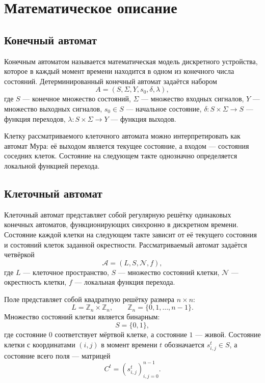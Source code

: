 \section{Математическое описание}

\subsection{Конечный автомат}

Конечным автоматом называется математическая модель дискретного устройства,
которое в каждый момент времени находится в одном из конечного числа состояний.
Детерминированный конечный автомат задаётся набором
\begin{equation}
    A = (S, \Sigma, Y, s_0, \delta, \lambda),
\end{equation}
где $S$ --- конечное множество состояний, $\Sigma$ --- множество входных
сигналов, $Y$ --- множество выходных сигналов, $s_0 \in S$ --- начальное
состояние, $\delta \colon S \times \Sigma \to S$ --- функция переходов,
$\lambda \colon S \times \Sigma \to Y$ --- функция выходов.

Клетку рассматриваемого клеточного автомата можно интерпретировать как автомат
Мура: её выходом является текущее состояние, а входом --- состояния соседних
клеток. Состояние на следующем такте однозначно определяется локальной функцией
перехода.

\subsection{Клеточный автомат}

Клеточный автомат представляет собой регулярную решётку одинаковых конечных
автоматов, функционирующих синхронно в дискретном времени. Состояние каждой
клетки на следующем такте зависит от её текущего состояния и состояний клеток
заданной окрестности. Рассматриваемый автомат задаётся четвёркой
\begin{equation}
    \mathcal{A} = (L, S, \mathcal{N}, f),
\end{equation}
где $L$ --- клеточное пространство, $S$ --- множество состояний клетки,
$\mathcal{N}$ --- окрестность клетки, $f$ --- локальная функция перехода.

Поле представляет собой квадратную решётку размера $n \times n$:
\begin{equation}
    L = \mathbb{Z}_n \times \mathbb{Z}_n,
    \qquad
    \mathbb{Z}_n = \{0, 1, \ldots, n-1\}.
\end{equation}
Множество состояний клетки является бинарным:
\begin{equation}
    S = \{0,1\},
\end{equation}
где состояние $0$ соответствует мёртвой клетке, а состояние $1$ --- живой.
Состояние клетки с координатами $(i,j)$ в момент времени $t$ обозначается
$s^t_{i,j} \in S$, а состояние всего поля --- матрицей
\begin{equation}
    C^t = \left(s^t_{i,j}\right)_{i,j=0}^{n-1}.
\end{equation}

